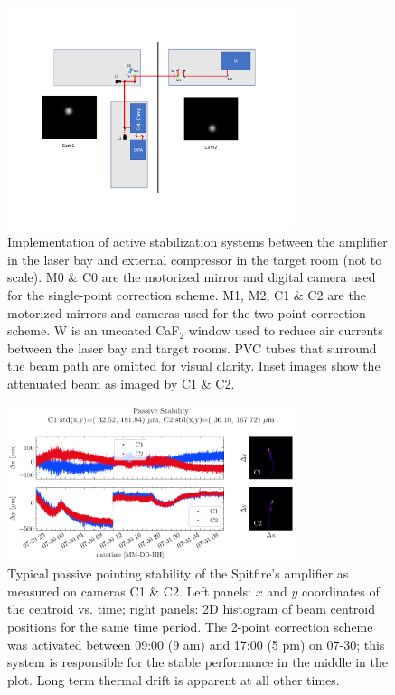 \begin{figure}
	\centering
	\includegraphics[width=0.75\textwidth]{figures/chap2/guidestar_geometry.pdf}
	\caption{Implementation of active stabilization systems between the amplifier in the laser bay and external compressor in the target room (not to scale). M0 \& C0 are the motorized mirror and digital camera used for the single-point correction scheme. M1, M2, C1 \& C2 are the motorized mirrors and cameras used for the two-point correction scheme. W is an uncoated CaF$_2$ window used to reduce air currents between the laser bay and target rooms. PVC tubes that surround the beam path are omitted for visual clarity. Inset images show the attenuated beam as imaged by C1 \& C2.}
	\label{fig:guidestar_geometry}
\end{figure}

\begin{figure}
	\centering
	\includegraphics[width=0.75\textwidth]{figures/chap2/Stability_NoCorrection.pdf}
	\caption{Typical passive pointing stability of the Spitfire's amplifier as measured on cameras C1 \& C2. Left panels: $x$ and $y$ coordinates of the centroid vs. time; right panels: 2D histogram of beam centroid positions for the same time period. The 2-point correction scheme was activated between 09:00 (9 am) and 17:00 (5 pm) on 07-30; this system is responsible for the stable performance in the middle in the plot. Long term thermal drift is apparent at all other times.}
	\label{fig:guidestar_passive_stability}
\end{figure}

